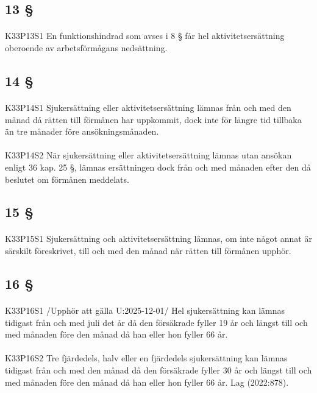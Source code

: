 \documentclass[a4paper,notitlepage,openany,10pt]{book}
\begin{document}
\subsection*{13 §}
\paragraph*{}
{\tiny K33P13S1}
En funktionshindrad som avses i 8 § får hel aktivitetsersättning oberoende av arbetsförmågans nedsättning.
\subsection*{14 §}
\paragraph*{}
{\tiny K33P14S1}
Sjukersättning eller aktivitetsersättning lämnas från och med den månad då rätten till förmånen har uppkommit, dock inte för längre tid tillbaka än tre månader före ansökningsmånaden.
\paragraph*{}
{\tiny K33P14S2}
När sjukersättning eller aktivitetsersättning lämnas utan ansökan enligt 36 kap. 25 §, lämnas ersättningen dock från och med månaden efter den då beslutet om förmånen meddelats.
\subsection*{15 §}
\paragraph*{}
{\tiny K33P15S1}
Sjukersättning och aktivitetsersättning lämnas, om inte något annat är särskilt föreskrivet, till och med den månad när rätten till förmånen upphör.
\subsection*{16 §}
\paragraph*{}
{\tiny K33P16S1}
/Upphör att gälla U:2025-12-01/
Hel sjukersättning kan lämnas tidigast från och med juli det år då den försäkrade fyller 19 år och längst till och med månaden före den månad då han eller hon fyller 66 år.
\paragraph*{}
{\tiny K33P16S2}
Tre fjärdedels, halv eller en fjärdedels sjukersättning kan lämnas tidigast från och med den månad då den försäkrade fyller 30 år och längst till och med månaden före den månad då han eller hon fyller 66 år.
Lag (2022:878).
\end{document}
